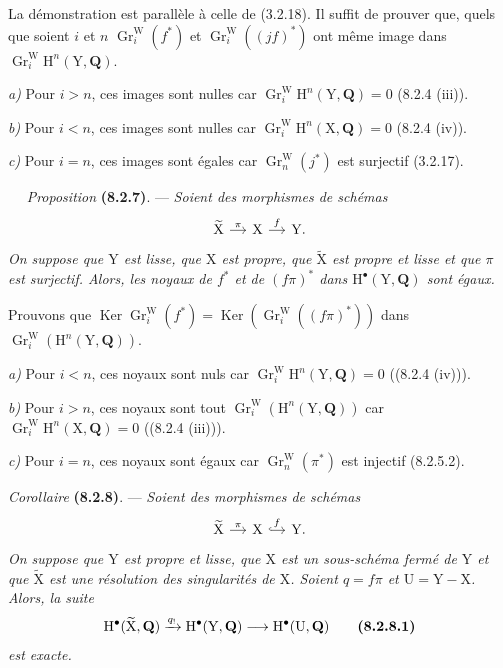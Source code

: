 \documentclass[11pt,leqno]{article}
\newcommand{\Page}[1]{\ifvmode\noindent\else\unskip\ \fi{\footnotesize\textcolor{gray}{[p.\,#1]}}\ \ignorespaces}
\begin{document}
La démonstration est parallèle à celle de (3.2.18). Il suffit de prouver que, quels que soient \(i\) et \(n\) \(\operatorname{Gr}_i^{\mathrm{W}}(f^*)\) et \(\operatorname{Gr}_i^{\mathrm{W}}((jf)^*)\) ont même image dans \(\operatorname{Gr}_i^{\mathrm{W}}\mathrm{H}^n(\mathrm{Y},\mathbf{Q})\).

\textit{a)} Pour \(i>n\), ces images sont nulles car \(\operatorname{Gr}_i^{\mathrm{W}}\mathrm{H}^n(\mathrm{Y},\mathbf{Q})=0\) (8.2.4 (iii)).

\textit{b)} Pour \(i<n\), ces images sont nulles car \(\operatorname{Gr}_i^{\mathrm{W}}\mathrm{H}^n(\mathrm{X},\mathbf{Q})=0\) (8.2.4 (iv)).

\textit{c)} Pour \(i=n\), ces images sont égales car \(\operatorname{Gr}_n^{\mathrm{W}}(j^*)\) est surjectif (3.2.17).

\Page{40}
\textit{Proposition} \textbf{(8.2.7)}. — \textit{Soient des morphismes de schémas}
\[
\begin{tikzcd}[column sep=small]
\widetilde{\mathrm{X}} \arrow[r,"\pi"]
 & \mathrm{X} \arrow[r,"f"]
 & \mathrm{Y}.
\end{tikzcd}
\]
\textit{On suppose que \(\mathrm{Y}\) est lisse, que \(\mathrm{X}\) est propre, que \(\widetilde{\mathrm{X}}\) est propre et lisse et que \(\pi\) est surjectif. Alors, les noyaux de \(f^*\) et de \((f\pi)^*\) dans \(\mathrm{H}^\bullet(\mathrm{Y},\mathbf{Q})\) sont égaux.}

Prouvons que \(\operatorname{Ker}\operatorname{Gr}_i^{\mathrm{W}}(f^*)=\operatorname{Ker}(\operatorname{Gr}_i^{\mathrm{W}}((f\pi)^*))\) dans \(\operatorname{Gr}_i^{\mathrm{W}}(\mathrm{H}^n(\mathrm{Y},\mathbf{Q}))\).

\textit{a)} Pour \(i<n\), ces noyaux sont nuls car \(\operatorname{Gr}_i^{\mathrm{W}}\mathrm{H}^n(\mathrm{Y},\mathbf{Q})=0\) ((8.2.4 (iv))).

\textit{b)} Pour \(i>n\), ces noyaux sont tout \(\operatorname{Gr}_i^{\mathrm{W}}(\mathrm{H}^n(\mathrm{Y},\mathbf{Q}))\) car \(\operatorname{Gr}_i^{\mathrm{W}}\mathrm{H}^n(\mathrm{X},\mathbf{Q})=0\) ((8.2.4 (iii))).

\textit{c)} Pour \(i=n\), ces noyaux sont égaux car \(\operatorname{Gr}_n^{\mathrm{W}}(\pi^*)\) est injectif (8.2.5.2).

\textit{Corollaire} \textbf{(8.2.8)}. — \textit{Soient des morphismes de schémas}
\[
\begin{tikzcd}[column sep=small]
\widetilde{\mathrm{X}} \arrow[r,"\pi"]
 & \mathrm{X} \arrow[r,hook,"f"]
 & \mathrm{Y}.
\end{tikzcd}
\]
\textit{On suppose que \(\mathrm{Y}\) est propre et lisse, que \(\mathrm{X}\) est un sous-schéma fermé de \(\mathrm{Y}\) et que \(\widetilde{\mathrm{X}}\) est une résolution des singularités de \(\mathrm{X}\). Soient \(q=f\pi\) et \(\mathrm{U}=\mathrm{Y}-\mathrm{X}\). Alors, la suite}
\[
\mathrm{H}^\bullet(\widetilde{\mathrm{X}},\mathbf{Q})
\xrightarrow{q_!}\mathrm{H}^\bullet(\mathrm{Y},\mathbf{Q})
\longrightarrow\mathrm{H}^\bullet(\mathrm{U},\mathbf{Q})
\tag*{\textbf{(8.2.8.1)}}
\]
\textit{est exacte.}
\end{document}
